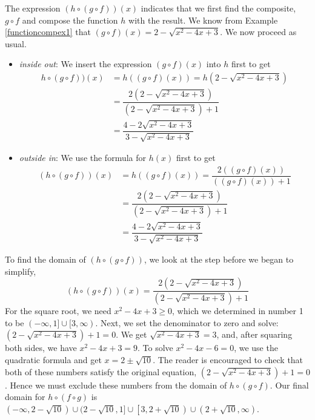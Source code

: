 {
The expression $(h \circ (g \circ f))(x)$ indicates that we first find the composite, $g \circ f$ and compose the function $h$ with the result.  We know from Example \ref{functioncompex1} that $(g \circ f)(x) =  2 - \sqrt{x^2-4x+3}$.  We now proceed as usual.

\begin{itemize}

\item  \textit{inside out}: We insert the expression $(g \circ f)(x)$ into $h$ first to get
\begin{align*}
h \circ (g \circ f))(x) & = h((g \circ f)(x))=h\left(2 - \sqrt{x^2-4x+3}\right)\\[3pt]
 & = \dfrac{2 \left(2 - \sqrt{x^2-4x+3}\right)}{\left(2 - \sqrt{x^2-4x+3}\right)+1} \\[3pt]
 & = \dfrac{4 - 2\sqrt{x^2-4x+3}}{3 - \sqrt{x^2-4x+3}}
\end{align*}

\item  \textit{outside in}:  We use the formula for $h(x)$ first to get
\begin{align*}
(h \circ (g \circ f))(x) & = h((g \circ f)(x))=\dfrac{2 \left( (g \circ f)(x)\right)}{  \left( (g \circ f)(x)\right) + 1} \\[3pt]
& = \dfrac{2 \left(2 - \sqrt{x^2-4x+3}\right)}{\left(2 - \sqrt{x^2-4x+3}\right)+1}\\[3pt]
 & = \dfrac{4 - 2\sqrt{x^2-4x+3}}{3 - \sqrt{x^2-4x+3}}
 \end{align*}
 
 \end{itemize}
 
To find the domain of $(h \circ (g \circ f))$, we look at the step before we began to simplify, \[(h \circ (g \circ f))(x) = \frac{2 \left(2 - \sqrt{x^2-4x+3}\right)}{\left(2 - \sqrt{x^2-4x+3}\right)+1}\]  For the square root, we need $x^2-4x+3 \geq 0$, which we determined in number 1 to be $(-\infty, 1] \cup [3,\infty)$.  Next, we set the denominator to zero and solve:  $\left(2 - \sqrt{x^2-4x+3}\right)+1 = 0$.  We get $\sqrt{x^2-4x+3} = 3$, and, after squaring both sides, we have $x^2-4x+3 = 9$.  To solve $x^2-4x-6 = 0$, we use the quadratic formula and get $x = 2 \pm \sqrt{10}$.  The reader is encouraged to check that both of these numbers satisfy the original equation, $\left(2 - \sqrt{x^2-4x+3}\right)+1 = 0$.  Hence we must exclude these numbers from the domain of $h \circ (g \circ f)$.  Our final domain for $h \circ (f \circ g)$ is $(-\infty, 2 -\sqrt{10}) \cup (2 - \sqrt{10}, 1] \cup \left[3, 2 + \sqrt{10}\right) \cup \left(2+\sqrt{10}, \infty\right)$.

}
